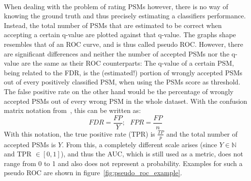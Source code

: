 	\renewcommand{\baselinestretch}{1}
	\\
	When dealing with the problem of rating PSMs however, there is no way of knowing the ground truth and thus precisely estimating a classifiers performance. Instead, the total number of PSMs that are estimated to be correct when accepting a certain q-value are plotted against that q-value. The graphs shape resembles that of an ROC curve, and is thus called pseudo ROC. However, there are significant differences and neither the number of accepted PSMs nor the q-value are the same as their ROC counterparts: The q-value of a certain PSM, being related to the FDR, is the (estimated!) portion of wrongly accepted PSMs out of every positively classified PSM, when using the PSMs score as threshold. The false positive rate on the other hand would be the percentage of wrongly accepted PSMs out of every wrong PSM in the whole dataset. With the confusion matrix notation from~\citet{Fawcett2006}, this can be written as:\\
	\begin{equation}
		FDR = \frac{FP}{Y};~~~ FPR = \frac{FP}{n}
	\end{equation}
	With this notation, the true positive rate (TPR) is $\frac{TP}{p}$ and the total number of accepted PSMs is $Y$. From this, a completely different scale arises (since $Y \in \mathbb{N}$ and TPR $\in [0,1]$), and thus the AUC, which is still used as a metric, does not range from 0 to 1 and also does not represent a probability. Examples for such a pseudo ROC are shown in figure~\ref{fig:pseudo_roc_example}.
	\renewcommand{\baselinestretch}{0.9}
